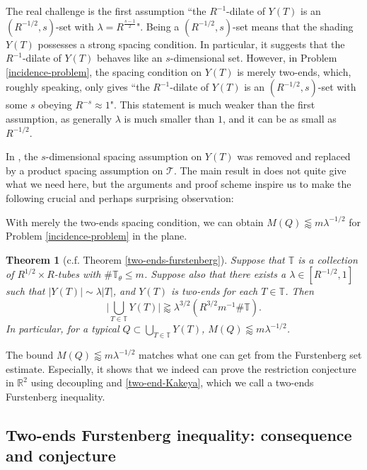 \documentclass{amsart}
\numberwithin{equation}{section}
\newtheorem{theorem}{Theorem}[section]
\newcommand{\la}{\lambda}
\newcommand{\ZR}{\mathbb{R}}
\newcommand{\ZT}{\mathbb{T}}
\newcommand{\cT}{{\mathcal T}}
\begin{document}
\smallskip

The real challenge is the first assumption ``the $R^{-1}$-dilate of $Y(T)$ is an $(R^{-1/2},s)$-set with $\la=R^{\frac{s-1}{2}}$".
Being a $(R^{-1/2},s)$-set means that the shading $Y(T)$ possesses a strong spacing condition. 
In particular, it suggests that the $R^{-1}$-dilate of $Y(T)$ behaves like an $s$-dimensional set.
However, in Problem \ref{incidence-problem}, the spacing condition on $Y(T)$ is merely two-ends, which, roughly speaking, only gives ``the $R^{-1}$-dilate of $Y(T)$ is an $(R^{-1/2},s)$-set with some $s$ obeying $R^{-s}\approx 1$". 
This statement is much weaker than the first assumption, as generally $\la$ is much smaller than $1$, and it can be as small as $R^{-1/2}$. 

\smallskip 


In \cite[Corollary 1.5]{Demeter-Wang}, the $s$-dimensional spacing assumption on $Y(T)$ was removed and replaced by a product spacing assumption on $\cT$.  
The main result in \cite{Demeter-Wang} does not quite give what we need here, but the arguments and proof scheme inspire us to make the following crucial and perhaps surprising observation:

\medskip

With merely the two-ends spacing condition, we can obtain $M(Q)\lessapprox m\la^{-1/2}$ for Problem \ref{incidence-problem} in the plane.

\begin{theorem}[c.f. Theorem \ref{two-ends-furstenberg}]
Suppose that $\ZT$ is a collection of $R^{1/2}\times R$-tubes with $\#\ZT_\theta\leq m$.
Suppose also that there exists a $\la\in[R^{-1/2},1]$ such that $|Y(T)|\sim\la |T|$, and $Y(T)$ is two-ends for each $T\in \ZT$.
Then
\begin{equation}
\label{two-end-Kakeya}
    \big|\bigcup_{T\in \ZT}Y(T)\big|\gtrapprox \la^{3/2}(R^{3/2}m^{-1}\#\ZT).
\end{equation}
In particular, for a typical $Q\subset\bigcup_{T\in \ZT}Y(T)$, $M(Q)\lessapprox m\la^{-1/2}$.
\end{theorem}

The bound $M(Q)\lessapprox m\la^{-1/2}$ matches what one can get from the Furstenberg set estimate. 
Especially, it shows that we indeed can prove the restriction conjecture in $\ZR^2$ using decoupling and \eqref{two-end-Kakeya}, which we call a two-ends Furstenberg inequality.

\medskip

\subsection{Two-ends Furstenberg inequality: consequence and conjecture}
\end{document}
